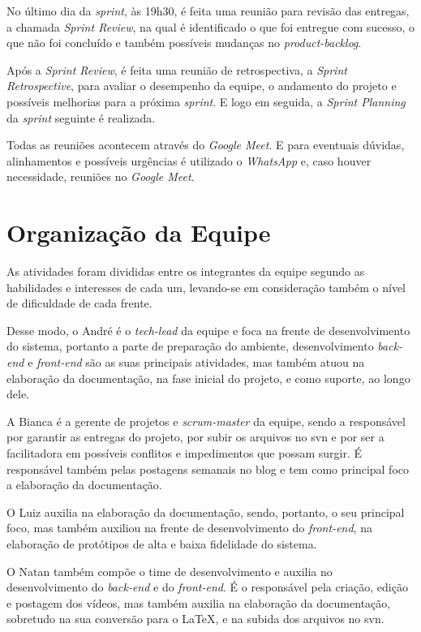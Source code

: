 No último dia da \textit{\gls{sprint}}, às 19h30, é feita uma reunião para revisão das entregas, a chamada \textit{Sprint Review}, na qual é identificado o que foi entregue com sucesso, o que não foi concluído e também possíveis mudanças no \textit{\gls{product-backlog}}. 


Após a \textit{Sprint Review}, é feita uma reunião de retrospectiva, a \textit{Sprint Retrospective}, para avaliar o desempenho da equipe, o andamento do projeto e possíveis melhorias para a próxima \textit{\gls{sprint}}. E logo em seguida, a \textit{Sprint Planning} da \textit{\gls{sprint}} seguinte é realizada.


Todas as reuniões acontecem através do \textit{Google Meet}.
E para eventuais dúvidas, alinhamentos e possíveis urgências é utilizado o \textit{WhatsApp} e, caso houver necessidade, reuniões no \textit{Google Meet}. 


\section{Organização da Equipe}
As atividades foram divididas entre os integrantes da equipe segundo as habilidades e interesses de cada um, levando-se em consideração também o nível de dificuldade de cada frente.


Desse modo, o André é o \textit{\gls{tech-lead}} da equipe e foca na frente de desenvolvimento do sistema, portanto a parte de preparação do ambiente, desenvolvimento \textit{\gls{back-end}} e \textit{\gls{front-end}} são as suas principais atividades, mas também atuou na elaboração da documentação, na fase inicial do projeto, e como suporte, ao longo dele.

A Bianca é a gerente de projetos e \textit{\gls{scrum-master}} da equipe, sendo a responsável por garantir as entregas do projeto, por subir os arquivos no \ac{svn} e por ser a facilitadora em possíveis conflitos e impedimentos que possam surgir. É responsável também pelas postagens semanais no blog e tem como principal foco a elaboração da documentação.

O Luiz auxilia na elaboração da documentação, sendo, portanto, o seu principal foco, mas também auxiliou na frente de desenvolvimento do \textit{\gls{front-end}}, na elaboração de protótipos de alta e baixa fidelidade do sistema.

O Natan também compõe o time de desenvolvimento e auxilia no desenvolvimento do \textit{\gls{back-end}} e do \textit{\gls{front-end}}. É o responsável pela criação, edição e postagem dos vídeos, mas também auxilia na elaboração da documentação, sobretudo na sua conversão para o LaTeX, e na subida dos arquivos no \ac{svn}.


